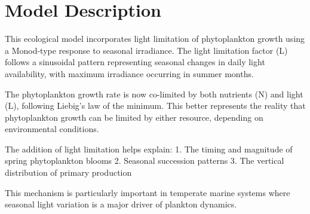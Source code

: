 \section{Model Description}

This ecological model incorporates light limitation of phytoplankton growth using a Monod-type response to seasonal irradiance. The light limitation factor (L) follows a sinusoidal pattern representing seasonal changes in daily light availability, with maximum irradiance occurring in summer months.

The phytoplankton growth rate is now co-limited by both nutrients (N) and light (L), following Liebig's law of the minimum. This better represents the reality that phytoplankton growth can be limited by either resource, depending on environmental conditions.

The addition of light limitation helps explain:
1. The timing and magnitude of spring phytoplankton blooms
2. Seasonal succession patterns
3. The vertical distribution of primary production

This mechanism is particularly important in temperate marine systems where seasonal light variation is a major driver of plankton dynamics.

